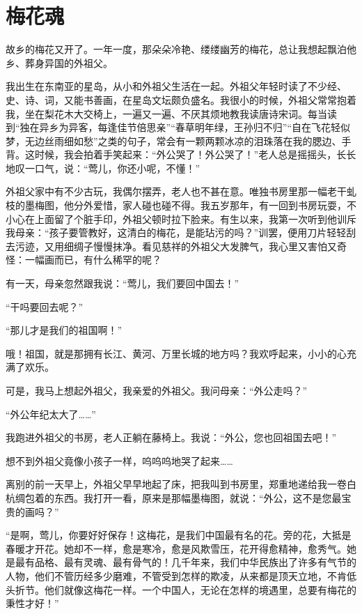 \documentclass[12pt,UTF-8,openany]{ctexbook}
\begin{document}
\chapter{梅花魂}

\begin{large}
    
    故乡的梅花又开了。一年一度，那朵朵冷艳、缕缕幽芳的梅花，总让我想起飘泊他乡、葬身异国的外祖父。
    
    我出生在东南亚的星岛，从小和外祖父生活在一起。外祖父年轻时读了不少经、史、诗、词，又能书善画，在星岛文坛颇负盛名。我很小的时候，外祖父常常抱着我，坐在梨花木大交椅上，一遍又一遍、不厌其烦地教我读唐诗宋词。每当读到“独在异乡为异客，每逢佳节倍思亲”“春草明年绿，王孙归不归”“自在飞花轻似梦，无边丝雨细如愁”之类的句子，常会有一颗两颗冰凉的泪珠落在我的腮边、手背。这时候，我会拍着手笑起来：“外公哭了！外公哭了！”老人总是摇摇头，长长地叹一口气，说：“莺儿，你还小呢，不懂！”
    
    外祖父家中有不少古玩，我偶尔摆弄，老人也不甚在意。唯独书房里那一幅老干虬枝的墨梅图，他分外爱惜，家人碰也碰不得。我五岁那年，有一回到书房玩耍，不小心在上面留了个脏手印，外祖父顿时拉下脸来。有生以来，我第一次听到他训斥我母亲：“孩子要管教好，这清白的梅花，是能玷污的吗？”训罢，便用刀片轻轻刮去污迹，又用细绸子慢慢抹净。看见慈祥的外祖父大发脾气，我心里又害怕又奇怪：一幅画而已，有什么稀罕的呢？
    
    有一天，母亲忽然跟我说：“莺儿，我们要回中国去！”
    
    “干吗要回去呢？”
    
    “那儿才是我们的祖国啊！”
    
    哦！祖国，就是那拥有长江、黄河、万里长城的地方吗？我欢呼起来，小小的心充满了欢乐。
    
    可是，我马上想起外祖父，我亲爱的外祖父。我问母亲：“外公走吗？”
    
    “外公年纪太大了……”
    
    我跑进外祖父的书房，老人正躺在藤椅上。我说：“外公，您也回祖国去吧！”
    
    想不到外祖父竟像小孩子一样，呜呜呜地哭了起来……
    
    离别的前一天早上，外祖父早早地起了床，把我叫到书房里，郑重地递给我一卷白杭绸包着的东西。我打开一看，原来是那幅墨梅图，就说：“外公，这不是您最宝贵的画吗？”
    
    “是啊，莺儿，你要好好保存！这梅花，是我们中国最有名的花。旁的花，大抵是春暖才开花。她却不一样，愈是寒冷，愈是风欺雪压，花开得愈精神，愈秀气。她是最有品格、最有灵魂、最有骨气的！几千年来，我们中华民族出了许多有气节的人物，他们不管历经多少磨难，不管受到怎样的欺凌，从来都是顶天立地，不肯低头折节。他们就像这梅花一样。一个中国人，无论在怎样的境遇里，总要有梅花的秉性才好！”
    

\end{large}
\end{document}
